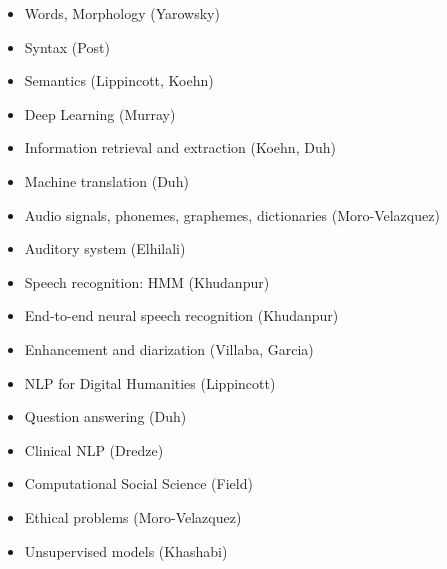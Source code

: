 \documentclass[landscape]{jhuslides3C}
\begin{document}

\vfill
\begin{itemize} \itemsep 0mm
\item Words, Morphology (Yarowsky)
\item Syntax (Post)
\item Semantics (Lippincott, Koehn)
\item Deep Learning (Murray)
\item Information retrieval and extraction (Koehn, Duh)
\item Machine translation (Duh)
\end{itemize}
\vfill




\vfill
\begin{itemize} \itemsep 0mm
\item Audio signals, phonemes, graphemes, dictionaries (Moro-Velazquez)
\item Auditory system (Elhilali)
\item Speech recognition: HMM (Khudanpur)
\item End-to-end neural speech recognition (Khudanpur) 
\item Enhancement and diarization (Villaba, Garcia)
\end{itemize}
\vfill


\vfill
\begin{itemize} \itemsep 0mm
\item NLP for Digital Humanities (Lippincott)
\item Question answering (Duh)
\item Clinical NLP (Dredze)
\item Computational Social Science (Field)
\item Ethical problems (Moro-Velazquez)
\item Unsupervised models (Khashabi)
\end{itemize}
\vfill

\end{document}
